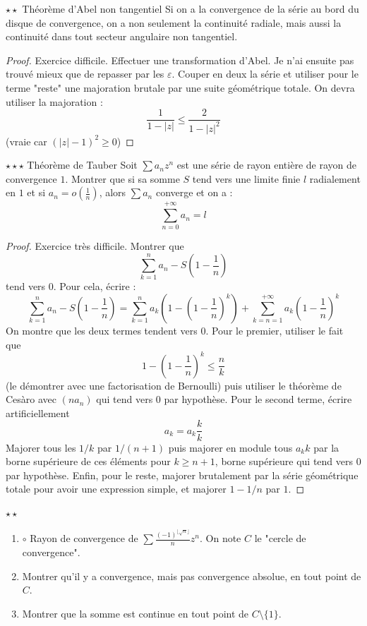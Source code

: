 \documentclass[french,a4paper]{article}
\theoremstyle{plain}
\theoremstyle{definition}
\theoremstyle{remark}
\begin{document}
\begin{ex}[Moulin.SE.55]{$\star\star$ Théorème d'Abel non tangentiel}
	Si on a la convergence de la série au bord du disque de convergence, on a non seulement la continuité radiale, mais aussi la continuité dans tout secteur angulaire non tangentiel.
\end{ex}
\begin{proof}
	Exercice difficile.
	Effectuer une transformation d'Abel. Je n'ai ensuite pas trouvé mieux que de repasser par les $\varepsilon$. Couper en deux la série et utiliser pour le terme "reste" une majoration brutale par une suite géométrique totale. On devra utiliser la majoration : $$\frac{1}{1-\lvert z\rvert}\leqslant\frac{2}{1-\lvert z\rvert^2}$$ (vraie car $(\lvert z\rvert -1)^2\geqslant0$)
\end{proof}

\begin{ex}[Moulin.SE.56]{$\star\star\star$ Théorème de Tauber}
	Soit $\sum a_nz^n$ est une série de rayon entière de rayon de convergence $1$. Montrer que si sa somme $S$ tend vers une limite finie $l$ radialement en $1$ et si $a_n=\displaystyle o\left(\frac{1}{n}\right)$, alors $\sum a_n$ converge et on a : $$\sum_{n=0}^{+\infty} a_n=l$$
\end{ex}
\begin{proof}
	Exercice très difficile. Montrer que $$\sum_{k=1}^{n}a_n-S\left(1-\frac{1}{n}\right)$$ tend vers $0$. Pour cela, écrire : $$\sum_{k=1}^{n}a_n-S\left(1-\frac{1}{n}\right)=\sum_{k=1}^{n}a_k\left(1-\left(1-\frac{1}{n}\right)^k\right)+\sum_{k=n=1}^{+\infty}a_k\left(1-\frac{1}{n}\right)^k$$ On montre que les deux termes tendent vers 0. Pour le premier, utiliser le fait que $$1-\left(1-\frac{1}{n}\right)^k\leqslant \frac{n}{k}$$ (le démontrer avec une factorisation de Bernoulli) puis utiliser le théorème de Cesàro avec $(na_n)$ qui tend vers $0$ par hypothèse. Pour le second terme, écrire artificiellement $$a_k=a_k\frac{k}{k}$$ Majorer tous les $1/k$ par $1/(n+1)$ puis majorer en module tous $a_kk$ par la borne supérieure de ces éléments pour $k\geqslant n+1$, borne supérieure qui tend vers $0$ par hypothèse. Enfin, pour le reste, majorer brutalement par la série géométrique totale pour avoir une expression simple, et majorer $1-1/n$ par $1$.
\end{proof}

\begin{ex}[Moulin.SE.57]{$\star\star$}
	\begin{enumerate}
		\item $\circ$ Rayon de convergence de $\displaystyle\sum\frac{(-1)^{\lfloor\sqrt{n}\rfloor}}{n}z^n$. On note $C$ le "cercle de convergence".
		\item Montrer qu'il y a convergence, mais pas convergence absolue, en tout point de $C$.
		\item Montrer que la somme est continue en tout point de $C\setminus\{1\}$.
	\end{enumerate}
\end{ex}
\end{document}
